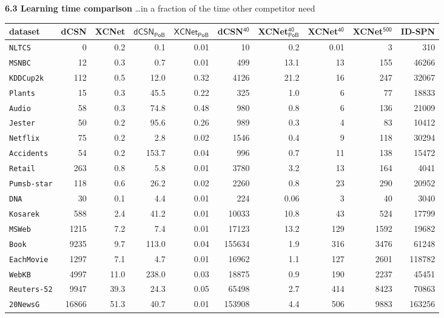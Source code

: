 \documentclass[final]{beamer}
\begin{document}
\begin{frame}{}
\begin{textblock}{17.5}
\vspace{15pt}
{\bf 6.3 Learning time comparison} \dots in a fraction of the time
other competitor need
\vspace{-10pt}
\begin{table}[t]
  \centering
  \setlength{\tabcolsep}{1pt}  
\tiny
  \begin{tabular}{l rrr r r r r r r}
    dataset           & \textsf{dCSN} & \textsf{XCNet} & $\mathsf{dCSN_{PoB}}$ &
    $\mathsf{XCNet_{PoB}}$ &\textsf{dCSN$^{\mathsf{40}}$} & \textsf{XCNet$^{\mathsf{40}}_\mathsf{PoB}$}& \textsf{XCNet$^{\mathsf{40}}$} & \textsf{XCNet$^{\mathsf{500}}$} & \textsf{ID-SPN}\\
    \midrule
    \texttt{NLTCS}& 0&0.2&0.1	&0.01&10&0.2& 0.01 & 3 &310\\ 
    \texttt{MSNBC} & 12&0.3&0.7&	0.01&499&13.1& 13 & 155 &46266\\ 
    \texttt{KDDCup2k}&112&0.5&12.0&0.32&4126&21.2& 16& 247 &32067\\ 
    \texttt{Plants}&15&0.3&45.5	&0.22&325&1.0& 6 & 77 &18833\\ 
    \texttt{Audio} & 58&0.3&74.8&0.48&980&0.8&6 &136 &21009\\ 
    \texttt{Jester}&50&0.2&95.6&	0.26&989&0.3&4 & 83 &10412\\ 
    \texttt{Netflix}&75&0.2&2.8&	0.02&1546&0.4& 9& 118&30294\\ 
    \texttt{Accidents}&54&0.2&153.7	&0.04&996&0.7& 11& 138 &15472\\ 
    \texttt{Retail}&263&0.8&5.8	&0.01&3780&3.2& 13 & 164&4041\\ 
    \texttt{Pumsb-star}&118&0.6&26.2&	0.02&2260&0.8& 23 & 290 &20952\\ 
    \texttt{DNA}&30&0.1&4.4&	0.01&224&0.06& 3& 40 &3040\\ 
    \texttt{Kosarek}&588&2.4&41.2&	0.01&10033&10.8& 43 &524 &17799\\ 
    \texttt{MSWeb}&1215&7.2&7.4	&0.01&17123&13.2& 129 & 1592 &19682\\ 
    \texttt{Book}&9235&9.7&113.0	&0.04&155634&1.9& 316& 3476&61248\\ 
    \texttt{EachMovie}&1297&7.1&4.7	&0.01&16962&1.1& 127 & 2601&118782\\ 
    \texttt{WebKB}&4997&11.0&238.0&	0.03&18875&0.9& 190 & 2237 &45451\\ 
    \texttt{Reuters-52}&9947&39.3&24.3&	0.05&65498&2.7& 414 & 8423 &70863\\ 
    \texttt{20NewsG}&16866&51.3&40.7&	0.01&153908&4.4& 506& 9883&163256\\ 

\end{tabular}
\end{table}
\end{textblock}
\end{frame}
\end{document}
